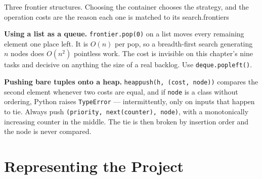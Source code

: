 {}%
{Three frontier structures. Choosing the container chooses the strategy, and the
operation costs are the reason each one is matched to its search.}{frontiers}

\begin{alertbox}
\textbf{Using a list as a queue.} \texttt{frontier.pop(0)} on a list moves every
remaining element one place left. It is $O(n)$ per pop, so a breadth-first search
generating $n$ nodes does $O(n^{2})$ pointless work. The cost is invisible on this
chapter's nine tasks and decisive on anything the size of a real backlog. Use
\texttt{deque.popleft()}.

\smallskip
\textbf{Pushing bare tuples onto a heap.} \texttt{heappush(h, (cost, node))}
compares the second element whenever two costs are equal, and if \texttt{node} is a
class without ordering, Python raises \texttt{TypeError} --- intermittently, only
on inputs that happen to tie. Always push
\texttt{(priority, next(counter), node)}, with a monotonically increasing counter
in the middle. The tie is then broken by insertion order and the node is never
compared.
\end{alertbox}

\section{Representing the Project}


